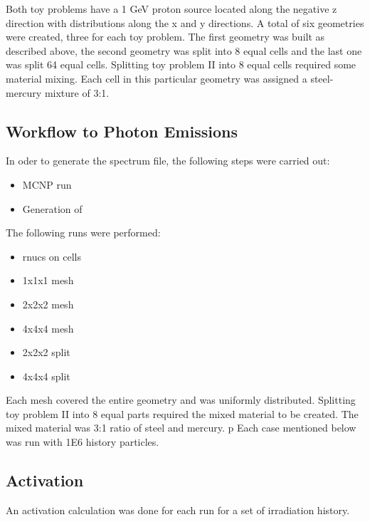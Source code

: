 Both toy problems have a 1 GeV proton source located 
along the negative z direction with distributions along the x and y directions.
A total of six geometries were created, three for each toy problem. 
The first geometry was built as described above, the second geometry 
was split into 8 equal cells and the last one was split 64 equal cells.
Splitting toy problem II into 8 equal cells required some material mixing. 
Each cell in this particular geometry was assigned a steel-mercury mixture
of 3:1. 

\subsection{Workflow to Photon Emissions}
In oder to generate the spectrum file, the following steps were carried out:
\begin{itemize}
\item MCNP run 
\item Generation of 
\end{itemize}
The following runs were performed:

\begin{itemize}
  \item rnucs on cells 
  \item 1x1x1 mesh
  \item 2x2x2 mesh
  \item 4x4x4 mesh 
  \item 2x2x2 split
  \item 4x4x4 split
\end{itemize}

Each mesh covered the entire geometry and was uniformly distributed. 
Splitting toy problem II into 8 equal parts required the mixed material to be created. 
The mixed material was 3:1 ratio of steel and mercury. 
p
Each case mentioned below was run with 1E6 history particles. 
\subsection{Activation}

An activation calculation was done for each run for a set of irradiation history. 




\newpage
